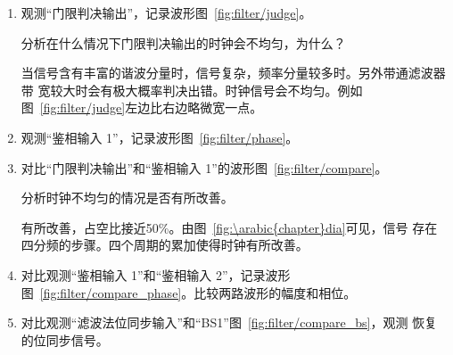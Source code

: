 \documentclass[../main]{subfiles}
\begin{document}


\begin{enumerate}
  \item 观测“门限判决输出”，记录波形图~\ref{fig:filter/judge}。

    \begin{Exercise}[title = 思考, label = ex:\arabic{chapter}\arabic{Exercise}]
      分析在什么情况下门限判决输出的时钟会不均匀，为什么？
    \end{Exercise}

    \begin{Answer}
      当信号含有丰富的谐波分量时，信号复杂，频率分量较多时。另外带通滤波器带
      宽较大时会有极大概率判决出错。时钟信号会不均匀。例如
      图~\ref{fig:filter/judge}左边比右边略微宽一点。
    \end{Answer}

  \item 观测“鉴相输入 1”，记录波形图~\ref{fig:filter/phase}。
  \item 对比“门限判决输出”和“鉴相输入 1”的波形图~\ref{fig:filter/compare}。

    \begin{Exercise}[title = 思考, label = ex:\arabic{chapter}\arabic{Exercise}]
      分析时钟不均匀的情况是否有所改善。
    \end{Exercise}

    \begin{Answer}
      有所改善，占空比接近50\%。由图~\ref{fig:\arabic{chapter}dia}可见，信号
      存在四分频的步骤。四个周期的累加使得时钟有所改善。
    \end{Answer}

  \item 对比观测“鉴相输入 1”和“鉴相输入 2”，记录波形
    图~\ref{fig:filter/compare_phase}。比较两路波形的幅度和相位。
  \item 对比观测“滤波法位同步输入”和“BS1”图~\ref{fig:filter/compare_bs}，观测
    恢复的位同步信号。
\end{enumerate}
\end{document}
